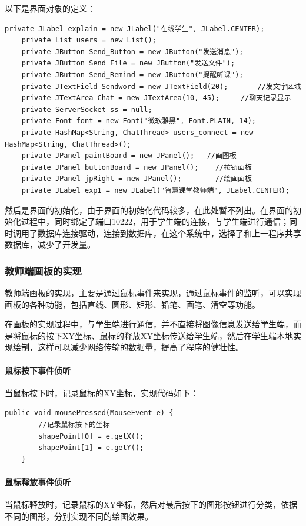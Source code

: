 \documentclass[UTF8,12pt]{article}
\begin{document}
以下是界面对象的定义：
\begin{lstlisting}[title=界面对象的定义,frame=shadowbox]
    private JLabel explain = new JLabel("在线学生", JLabel.CENTER);
    private List users = new List();
    private JButton Send_Button = new JButton("发送消息");
    private JButton Send_File = new JButton("发送文件");
    private JButton Send_Remind = new JButton("提醒听课");
    private JTextField Sendword = new JTextField(20);       //发文字区域
    private JTextArea Chat = new JTextArea(10, 45);     //聊天记录显示
    private ServerSocket ss = null;
    private Font font = new Font("微软雅黑", Font.PLAIN, 14);
    private HashMap<String, ChatThread> users_connect = new HashMap<String, ChatThread>();
    private JPanel paintBoard = new JPanel();   //画图板
    private JPanel buttonBoard = new JPanel();    //按钮面板
    private JPanel jpRight = new JPanel();        //绘画面板
    private JLabel exp1 = new JLabel("智慧课堂教师端", JLabel.CENTER);
\end{lstlisting}

然后是界面的初始化，由于界面的初始化代码较多，在此处暂不列出。在界面的初始化过程中，同时绑定了端口10222，用于学生端的连接，与学生端进行通信；同时调用了数据库连接驱动，连接到数据库，在这个系统中，选择了和上一程序共享数据库，减少了开发量。

\subsubsection{教师端画板的实现}
教师端画板的实现，主要是通过鼠标事件来实现，通过鼠标事件的监听，可以实现画板的各种功能，包括直线、圆形、矩形、铅笔、画笔、清空等功能。

在画板的实现过程中，与学生端进行通信，并不直接将图像信息发送给学生端，而是将鼠标的按下XY坐标、鼠标的释放XY坐标传送给学生端，然后在学生端本地实现绘制，这样可以减少网络传输的数据量，提高了程序的健壮性。

\paragraph{鼠标按下事件侦听}
当鼠标按下时，记录鼠标的XY坐标，实现代码如下：
\begin{lstlisting}[title=鼠标按下事件侦听,frame=shadowbox]
    public void mousePressed(MouseEvent e) {
        //记录鼠标按下的坐标
        shapePoint[0] = e.getX();
        shapePoint[1] = e.getY();
    }
\end{lstlisting}

\paragraph{鼠标释放事件侦听}
当鼠标释放时，记录鼠标的XY坐标，然后对最后按下的图形按钮进行分类，依据不同的图形，分别实现不同的绘图效果。
\end{document}

